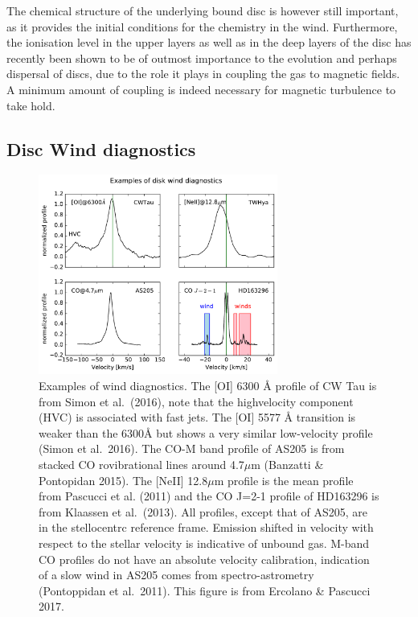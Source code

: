 \documentclass[10pt,fleqn,twoside]{article}
\begin{document}
The chemical structure of the underlying bound disc is however still
important, as it provides the initial conditions for the chemistry in
the wind. Furthermore, the ionisation level in the upper layers as
well as in the deep layers of the disc has recently been shown to be of outmost importance to the evolution and perhaps dispersal of discs, due to the role it plays in coupling the gas to magnetic fields. A minimum amount of coupling is indeed necessary for magnetic turbulence to take hold.


\subsection{Disc Wind diagnostics}
 \begin{figure}
   \centering
   \includegraphics[width=0.7\textwidth]{winds.pdf}

   \caption{Examples of wind diagnostics. The [OI] 6300 Å profile of CW Tau is from Simon et al.\ (2016), note that the highvelocity
component (HVC) is associated with fast jets. The [OI] 5577 Å transition is weaker than the 6300Å but shows a
very similar low-velocity profile (Simon et al.\ 2016). The CO-M band profile of AS205 is from stacked CO rovibrational
lines around 4.7$\mu$m (Banzatti \& Pontopidan 2015). The [NeII] 12.8$\mu$m profile is the mean profile from Pascucci et al.
(2011) and the CO J=2-1 profile of HD163296 is from Klaassen et al.\ (2013). All profiles, except that of AS205, are in
the stellocentrc reference frame. Emission shifted in velocity with respect to the stellar velocity is indicative of unbound
gas. M-band CO profiles do not have an absolute velocity calibration, indication of a slow wind in AS205 comes from
spectro-astrometry (Pontoppidan et al.\ 2011). This figure is from
Ercolano \& Pascucci 2017.}
              \label{fig:neii}%
    \end{figure}
\end{document}
